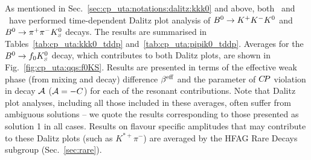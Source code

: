 \label{sec:cp_uta:qqs:dp}

As mentioned in Sec.~\ref{sec:cp_uta:notations:dalitz:kkk0} and above,
both \babar\ and \belle\ have performed time-dependent Dalitz plot analysis of
$B^0 \to K^+K^-K^0$ and $B^0 \to \pi^+\pi^-K^0_{\scriptscriptstyle S}$ decays.
The results are summarised in Tables~\ref{tab:cp_uta:kkk0_tddp} 
and~\ref{tab:cp_uta:pipik0_tddp}.
Averages for the $B^0\to f_0 K^0_{\scriptscriptstyle S}$ decay, which contributes to both Dalitz
plots, are shown in Fig.~\ref{fig:cp_uta:qqs:f0KS}.
Results are presented in terms of the effective weak phase (from mixing and
decay) difference $\beta^{\rm eff}$ and the parameter of $C\!P$ violation in decay
${\cal A}$ (${\cal A} = -C$) for each of the resonant contributions.
Note that Dalitz plot analyses, including all those included in these
averages, often suffer from ambiguous solutions -- we quote the results
corresponding to those presented as solution 1 in all cases.
Results on flavour specific amplitudes that may contribute to these Dalitz
plots (such as $K^{*+}\pi^-$) are averaged by the HFAG Rare Decays subgroup 
(Sec.~\ref{sec:rare}).




